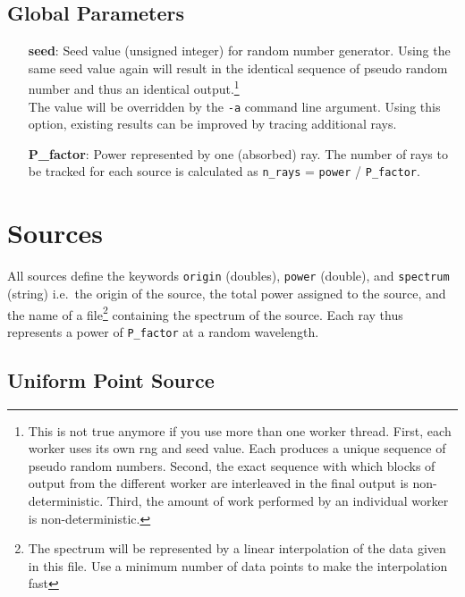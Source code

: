 \documentclass[10pt,a4paper,titlepage]{article}
\begin{document}
\subsection{Global Parameters}
\begin{itemize}
\item[{\bf seed}:]{Seed value (unsigned integer) for random number generator. Using the same seed value again will result in the identical sequence of pseudo random number and thus an identical output.\footnote{This is not true anymore if you use more than one worker thread. First, each worker uses its own rng and seed value. Each produces a unique sequence of pseudo random numbers. Second, the exact sequence with which blocks of output from the different worker are interleaved in the final output is non-deterministic. Third, the amount of work performed by an individual worker is non-deterministic.}\\
The value will be overridden by the {\tt -a} command line argument. Using this option, existing results can be improved by tracing additional rays.}
\item[{\bf P\_factor}:]{Power represented by one (absorbed) ray. The number of rays to be tracked for each source is calculated as {\tt n\_rays} = {\tt power} / {\tt P\_factor}.}
\end{itemize}



\section{Sources}

All sources define the keywords {\tt origin} (doubles), {\tt power} (double), and {\tt spectrum} (string) i.e.\ the origin of the source, the total power assigned to the source, and the name of a file\footnote{The spectrum will be represented by a linear interpolation of the data given in this file. Use a minimum number of data points to make the interpolation fast} containing the spectrum of the source. Each ray thus represents a power of {\tt P\_factor} at a random wavelength.

\subsection{Uniform Point Source}



\end{document}
